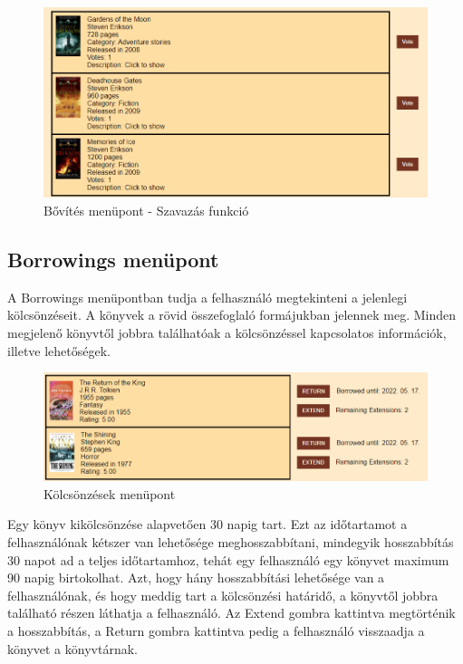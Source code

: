 \begin{figure}[H]
    \centering
    \includegraphics[scale=0.6]{images/application/expand.png}
    \caption{Bővítés menüpont - Szavazás funkció}
\end{figure}

\subsection{Borrowings menüpont}
A Borrowings menüpontban tudja a felhasználó megtekinteni a jelenlegi kölcsönzéseit. A könyvek a rövid összefoglaló formájukban jelennek meg. Minden megjelenő könyvtől jobbra találhatóak a kölcsönzéssel kapcsolatos információk, illetve lehetőségek. 

\begin{figure}[H]
    \centering
    \includegraphics[scale=0.6]{images/application/borrowings.png}
    \caption{Kölcsönzések menüpont}
\end{figure}

\bigskip

Egy könyv kikölcsönzése alapvetően 30 napig tart. Ezt az időtartamot a felhasználónak kétszer van lehetősége meghosszabbítani, mindegyik hosszabbítás 30 napot ad a teljes időtartamhoz, tehát egy felhasználó egy könyvet maximum 90 napig birtokolhat. Azt, hogy hány hosszabbítási lehetősége van a felhasználónak, és hogy meddig tart a kölcsönzési határidő, a könyvtől jobbra található részen láthatja a felhasználó. Az Extend gombra kattintva megtörténik a hosszabbítás, a Return gombra kattintva pedig a felhasználó visszaadja a könyvet a könyvtárnak. 

